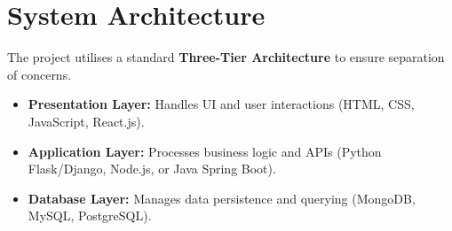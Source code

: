 \documentclass[12pt,a4paper]{report}
\begin{document}
\section{System Architecture}
The project utilises a standard \textbf{Three-Tier Architecture} to ensure separation of concerns.
\begin{itemize}
  \item \textbf{Presentation Layer:} Handles UI and user interactions (HTML, CSS, JavaScript, React.js).
  \item \textbf{Application Layer:} Processes business logic and APIs (Python Flask/Django, Node.js, or Java Spring Boot).
  \item \textbf{Database Layer:} Manages data persistence and querying (MongoDB, MySQL, PostgreSQL).
\end{itemize}
\end{document}
